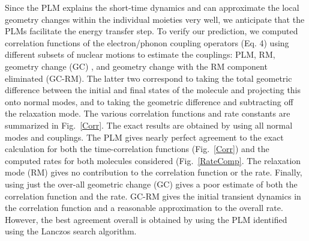Since the PLM explains the short-time dynamics and can approximate the local geometry changes within the individual
moieties very well, we anticipate that the PLMs facilitate the energy transfer step. To verify
our prediction, we computed correlation functions of the electron/phonon coupling operators
 (Eq. 4) using different  subsets of nuclear motions  to estimate the couplings:
 PLM,  RM,  geometry change (GC) , and
geometry change with the RM component eliminated (GC-RM).
The latter two correspond to taking the total geometric difference between the initial
and final states of the molecule and  projecting this onto normal modes, and to taking the geometric difference and
subtracting off the relaxation mode.
The various correlation functions and rate
constants are summarized in Fig.~\ref{Corr}.
The exact results are obtained by  using all normal modes and couplings.
The PLM gives nearly perfect agreement to the exact calculation  for both the
time-correlation functions (Fig.~\ref{Corr})  and the computed rates for both molecules considered  (Fig.~\ref{RateComp}.
The relaxation mode (RM) gives no contribution to the correlation function or the rate.
Finally, using just the over-all geometric change (GC) gives a poor estimate of both the correlation
function and the rate.   GC-RM gives the initial transient dynamics in the correlation function and
a reasonable approximation to  the overall rate.  However, the best agreement overall is
obtained by using the PLM identified using the Lanczos search algorithm.



%



%
%


